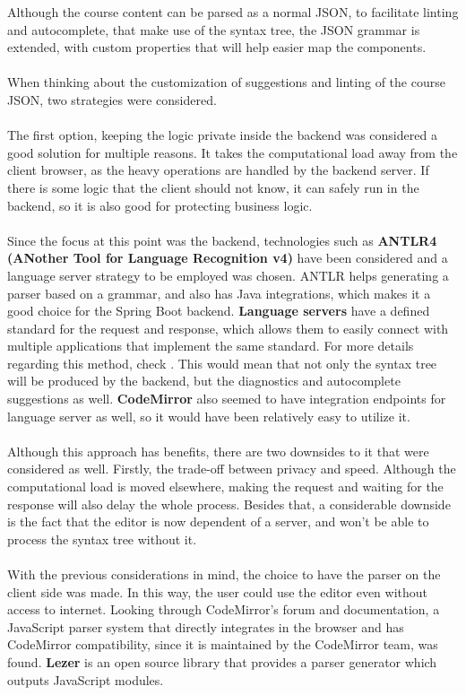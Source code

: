 \noindent Although the course content can be parsed as a normal JSON, to facilitate linting and autocomplete, that make use of the syntax tree, the JSON grammar is extended, with custom properties that will help easier map the components.
\\\\
\noindent When thinking about the customization of suggestions and linting of the course JSON, two strategies were considered.
\\\\
\noindent The first option, keeping the logic private inside the backend was considered a good solution for multiple reasons. It takes the computational load away from the client browser, as the heavy operations are handled by the backend server. If there is some logic that the client should not know, it can safely run in the backend, so it is also good for protecting business logic.
\\\\
\noindent Since the focus at this point was the backend, technologies such as \textbf{ANTLR4 (ANother Tool for Language Recognition v4)} have been considered and a language server strategy to be employed was chosen. ANTLR helps generating a parser based on a grammar, and also has Java integrations, which makes it a good choice for the Spring Boot backend. \textbf{Language servers} have a defined standard for the request and response, which allows them to easily connect with multiple applications that implement the same standard. For more details regarding this method, check \cite{language-server-protocol}. This would mean that not only the syntax tree will be produced by the backend, but the diagnostics and autocomplete suggestions as well. \textbf{CodeMirror} also seemed to have integration endpoints for language server as well, so it would have been relatively easy to utilize it.
\\\\
\noindent Although this approach has benefits, there are two downsides to it that were considered as well. Firstly, the trade-off between privacy and speed. Although the computational load is moved elsewhere, making the request and waiting for the response will also delay the whole process. Besides that, a considerable downside is the fact that the editor is now dependent of a server, and won't be able to process the syntax tree without it.
\\\\
\noindent With the previous considerations in mind, the choice to have the parser on the client side was made. In this way, the user could use the editor even without access to internet. Looking through CodeMirror's forum and documentation, a JavaScript parser system that directly integrates in the browser and has CodeMirror compatibility, since it is maintained by the CodeMirror team, was found. \textbf{Lezer} \cite{lezer} is an open source library that provides a parser generator which outputs JavaScript modules.
